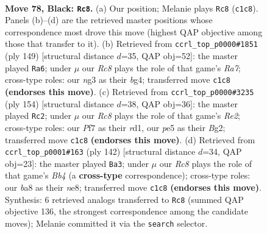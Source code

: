 \documentclass[11pt]{article}
\begin{document}
\clearpage

\begin{figure}[p]\centering
\begin{subfigure}{0.46\textwidth}\centering
\resizebox{\linewidth}{!}{%
\newchessgame
\chessboard[
  setfen={B7/5p2/n5p1/4P2p/b4Pp1/3k2N1/6KP/2r5 b - - 15 78},
  showmover=false,
  pgfstyle=straightmove, color=movearrow, markmove={c1-c8}
]}
\caption{}
\end{subfigure}\hfill
\begin{subfigure}{0.46\textwidth}\centering
\resizebox{\linewidth}{!}{%
\newchessgame
\chessboard[
  setfen={8/4kp2/4p3/3p2P1/3P1NB1/4PK2/r7/8 b - - 8 75},
  showmover=false,
  pgfstyle=straightmove, color=movearrow, markmove={a2-a6}
]}
\caption{}
\end{subfigure}
\\[4pt]
\begin{subfigure}{0.46\textwidth}\centering
\resizebox{\linewidth}{!}{%
\newchessgame
\chessboard[
  setfen={5k2/5p2/6pp/2p2n2/7P/1P4P1/4RPBK/3r4 w - - 0 78},
  showmover=false,
  pgfstyle=straightmove, color=movearrow, markmove={e2-c2}
]}
\caption{}
\end{subfigure}\hfill
\begin{subfigure}{0.46\textwidth}\centering
\resizebox{\linewidth}{!}{%
\newchessgame
\chessboard[
  setfen={4n3/6k1/2N3p1/5p1p/1B2nP1P/6P1/6K1/8 w - - 2 72},
  showmover=false,
  pgfstyle=straightmove, color=movearrow, markmove={b4-a3}
]}
\caption{}
\end{subfigure}
\caption{\textbf{Move 78, Black: \texttt{Rc8}.} (a) Our position; Melanie plays \texttt{Rc8} (\texttt{c1c8}). Panels (b)--(d) are the retrieved master positions whose correspondence most drove this move (highest QAP objective among those that transfer to it). (b) Retrieved from \texttt{ccrl\_top\_p0000\#1851} (ply 149) [structural distance $d$=35, QAP obj=52]: the master played \texttt{Ra6}; under $\mu$ our \emph{Rc8} plays the role of that game's \emph{Ra7}; cross-type roles: our \emph{n}g3 as their \emph{b}g4; transferred move \texttt{c1c8} \textbf{(endorses this move)}. (c) Retrieved from \texttt{ccrl\_top\_p0000\#3235} (ply 154) [structural distance $d$=38, QAP obj=36]: the master played \texttt{Rc2}; under $\mu$ our \emph{Rc8} plays the role of that game's \emph{Re2}; cross-type roles: our \emph{P}f7 as their \emph{r}d1, our \emph{p}e5 as their \emph{B}g2; transferred move \texttt{c1c8} \textbf{(endorses this move)}. (d) Retrieved from \texttt{ccrl\_top\_p0001\#163} (ply 142) [structural distance $d$=34, QAP obj=23]: the master played \texttt{Ba3}; under $\mu$ our \emph{Rc8} plays the role of that game's \emph{Bb4} (a \textbf{cross-type} correspondence); cross-type roles: our \emph{b}a8 as their \emph{n}e8; transferred move \texttt{c1c8} \textbf{(endorses this move)}. Synthesis: 6 retrieved analogs transferred to \texttt{Rc8} (summed QAP objective 136, the strongest correspondence among the candidate moves); Melanie committed it via the \texttt{search} selector.}
\label{fig:thought-m155}
\end{figure}
\end{document}
